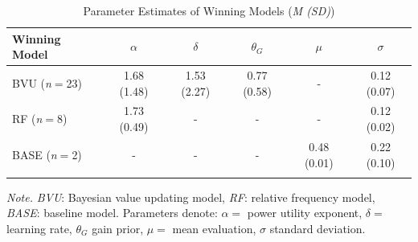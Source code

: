 \documentclass[a4paper, man, floatsintext]{apa6}
\begin{document}
\begin{table}[tbp]
\begin{center}
\begin{threeparttable}
\caption{\label{tab:model_par}Parameter Estimates of Winning Models (\textit{M (SD)})}
\begin{tabular}{lccccc}
\toprule
Winning Model & $\alpha$ & $\delta$ & $\theta_G$ & $\mu$ & $\sigma$\\
\midrule
BVU (\textit{n}$=$23) & 1.68 (1.48) & 1.53 (2.27) & 0.77 (0.58) & - & 0.12 (0.07)\\
RF (\textit{n}$=$8) & 1.73 (0.49) & - & - & - & 0.12 (0.02)\\
BASE (\textit{n}$=$2) & - & - & - & 0.48 (0.01) & 0.22 (0.10)\\
\bottomrule
\addlinespace
\end{tabular}
\begin{tablenotes}[para]
\normalsize{\textit{Note.} \textit{BVU}: Bayesian value updating model, \textit{RF}: relative frequency model, \textit{BASE}: baseline model. Parameters denote: $\alpha=$ power utility exponent, $\delta=$ learning rate, $\theta_G$ gain prior, $\mu=$ mean evaluation, $\sigma$ standard deviation.}
\end{tablenotes}
\end{threeparttable}
\end{center}
\end{table}
\end{document}
